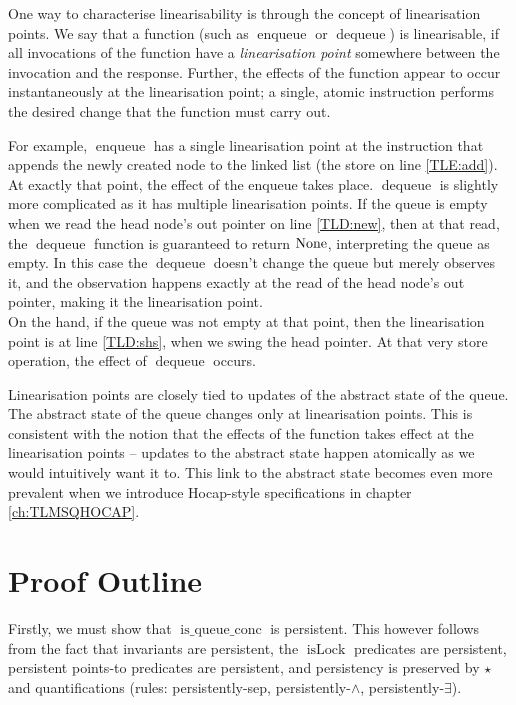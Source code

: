 \documentclass[a4paper, 10pt]{report}
\theoremstyle{definition}
\newcommand{\isLock}{\operatorname{isLock}}
\newcommand{\enqueue}{\operatorname{enqueue}}
\newcommand{\dequeue}{\operatorname{dequeue}}
\newcommand{\isqueueconc}{\operatorname{is\_queue\_conc}}
\begin{document}
One way to characterise linearisability is through the concept of linearisation points. We say that a function (such as $\enqueue$ or $\dequeue$) is linearisable, if all invocations of the function have a \textit{linearisation point} somewhere between the invocation and the response. Further, the effects of the function appear to occur instantaneously at the linearisation point; a single, atomic instruction performs the desired change that the function must carry out.

For example, $\enqueue$ has a single linearisation point at the instruction that appends the newly created node to the linked list (the store on line \ref{TLE:add}). At exactly that point, the effect of the enqueue takes place. $\dequeue$ is slightly more complicated as it has multiple linearisation points. If the queue is empty when we read the head node's out pointer on line \ref{TLD:new}, then at that read, the $\dequeue$ function is guaranteed to return $\operatorname{None}$, interpreting the queue as empty. In this case the $\dequeue$ doesn't change the queue but merely observes it, and the observation happens exactly at the read of the head node's out pointer, making it the linearisation point.\\
On the hand, if the queue was not empty at that point, then the linearisation point is at line \ref{TLD:shs}, when we swing the head pointer. At that very store operation, the effect of $\dequeue$ occurs.

Linearisation points are closely tied to updates of the abstract state of the queue. The abstract state of the queue changes only at linearisation points. This is consistent with the notion that the effects of the function takes effect at the linearisation points -- updates to the abstract state happen atomically as we would intuitively want it to. This link to the abstract state becomes even more prevalent when we introduce Hocap-style specifications in chapter \ref{ch:TLMSQHOCAP}.

\section{Proof Outline}
\label{TLMSQCONC:section:proof-outline}
Firstly, we must show that $\isqueueconc$ is persistent. This however follows from the fact that invariants are persistent, the $\isLock$ predicates are persistent, persistent points-to predicates are persistent, and persistency is preserved by $\star$ and quantifications (rules: persistently-sep, persistently-$\land$, persistently-$\exists$).
\end{document}
